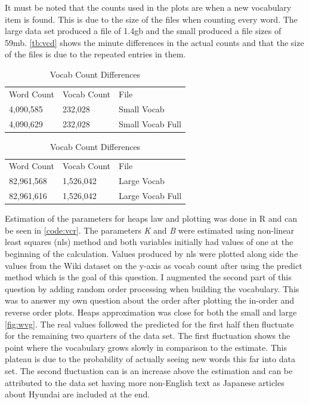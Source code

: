\documentclass[11pt]{article}
\begin{document}
\noindent It must be noted that the counts used in the plots are when a new vocabulary item is found. This is due to the size of the files when counting every word. The  large data set produced a file of 1.4gb and the small produced a file sizes of 59mb.  \autoref{tb:vcd} shows the minute differences in the actual counts and that the size of the files is due to the repeated entries in them.
\begin{table}[h]
\centering
\caption{Vocab Count Differences}
\label{tb:vcd}
\begin{minipage}{.5\linewidth}
\begin{tabular}{lll}
Word Count & Vocab Count & File \\
4,090,585 & 232,028 & Small Vocab \\
4,090,629 & 232,028 & Small Vocab Full
\end{tabular}
\end{minipage}%
\begin{minipage}{.5\linewidth}
\begin{tabular}{lll}
Word Count & Vocab Count & File \\
82,961,568 & 1,526,042 & Large Vocab \\
82,961,616 & 1,526,042 & Large Vocab Full
\end{tabular}
\end{minipage}
\end{table}
\newline \newline Estimation of the parameters for heaps law and plotting was done in R and can be seen in \autoref{code:vcr}.  The parameters \textit{K} and \textit{B} were estimated using non-linear least squares (nls) method and both variables initially had values of one at the beginning of the calculation. Values produced by nls were plotted along side the values from the Wiki dataset on the y-axis as vocab count after using the predict method which is the goal of this question. I augmented the second part of this question by adding random order processing when building the vocabulary. This was to answer my own question about the order after plotting the in-order and reverse order plots. \newline \newline 
Heaps approximation was close for both the small and large \autoref{fig:wvg}. The real values followed the predicted for the first half then fluctuate for the remaining two quarters of the data set. The first fluctuation shows the point where the vocabulary grows slowly in comparison to the estimate. This plateau is due to the probability of actually seeing new words this far into data set. The second fluctuation can is an increase above the estimation and can be attributed to the data set having more non-English text as Japanese articles about Hyundai are included at the end.
\end{document}
